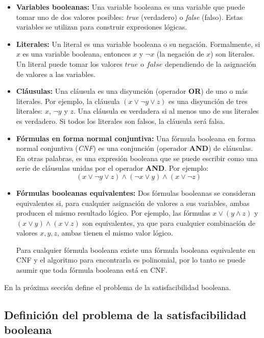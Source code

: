 \begin{itemize}
  \item \textbf{Variables booleanas:}
        Una variable booleana es una variable que puede tomar uno de dos valores posibles: \textit{true} (verdadero) o \textit{false} (falso). Estas variables se utilizan para construir expresiones lógicas.
  \item \textbf{Literales:}
        Un literal es una variable booleana o su negación. Formalmente, si \( x \) es una variable booleana, entonces \( x \) y \( \neg x \) (la negación de \( x \)) son literales. Un literal puede tomar los valores \( true \) o \( false \) dependiendo de la asignación de valores a las variables.
  \item  \textbf{Cláusulas:}
        Una cláusula es una disyunción (operador \textbf{OR}) de uno o más literales. Por ejemplo, la cláusula \( (x \vee \neg y \vee z) \) es una disyunción de tres literales: \( x \), \( \neg y \) y \( z \). Una cláusula es verdadera si al menos uno de sus literales es verdadero. Si todos los literales son falsos, la cláusula será falsa.
  \item \textbf{Fórmulas en forma normal conjuntiva:}
        Una fórmula booleana en forma normal conjuntiva (\textit{CNF}) es una conjunción (operador \textbf{AND}) de cláusulas. En otras palabras, es una expresión booleana que se puede escribir como una serie de cláusulas unidas por el operador \textbf{AND}. Por ejemplo:        
        \[
          (x \vee \neg y \vee z) \wedge (\neg x \vee y) \wedge (x \vee \neg z)
        \]
  \item \textbf{Fórmulas booleanas equivalentes:}
        Dos fórmulas booleanas se consideran equivalentes si, para cualquier asignación de valores a sus variables, ambas producen el mismo resultado lógico. Por ejemplo, las fórmulas \( x \vee (y \wedge z) \) y \( (x \vee y) \wedge (x \vee z) \) son equivalentes, ya que para cualquier combinación de valores \( x, y, z \), ambas tienen el mismo valor lógico.
        
        Para cualquier fórmula booleana existe una fórmula booleana equivalente en CNF \cite{authomataTheory} y 
        el algoritmo para encontrarla es polinomial, por lo tanto se puede asumir que toda fórmula booleana está en CNF.
        
\end{itemize}

En la próxima sección define el problema de la satisfacibilidad booleana.

\subsection{Definición del problema de la satisfacibilidad booleana}

